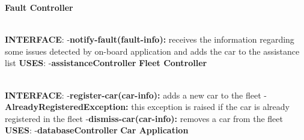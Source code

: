 \documentclass{article}
\begin{document}
\textbf{Fault Controller}\\
\begin{figure}[ht]
\end{figure}\\
\textbf{INTERFACE}:
 \newline
-\textbf{notify-fault(fault-info):} receives the information regarding some issues detected by on-board application and adds the car to the assistance list   
\newline
\textbf{USES}:   
\newline
-\textbf{assistanceController}
\newpage
\textbf{Fleet Controller}\\
\begin{figure}[ht]
\end{figure}\\
\textbf{INTERFACE}: 
 \newline
-\textbf{register-car(car-info):} adds a new car to the fleet
\newline
-\textbf{AlreadyRegisteredException:} this exception is raised if the car is already registered in the fleet 
\newline
-\textbf{dismiss-car(car-info):} removes a car from the fleet
\newline
\textbf{USES}:   
\newline
-\textbf{databaseController}
\newpage
\textbf{Car Application}\\
\begin{figure}[ht]
\end{figure}\\
\end{document}
